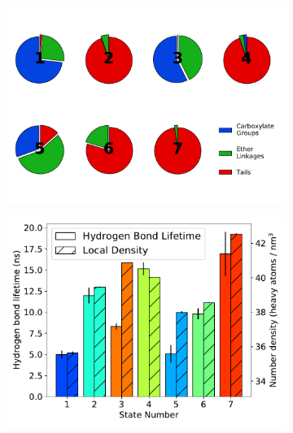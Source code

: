 \documentclass{article}
\begin{document}
  \begin{figure}
  \centering
  \begin{subfigure}{0.54\textwidth}
  \includegraphics[width=\textwidth]{hbond_pi_charts.pdf}
  \caption{}\label{fig:hbond_pi_charts}
  \end{subfigure}
  \begin{subfigure}{0.45\textwidth}
  \includegraphics[width=\textwidth]{hbond_lifetimes_density_MET.pdf}

\end{subfigure}
\end{figure}
\end{document}
